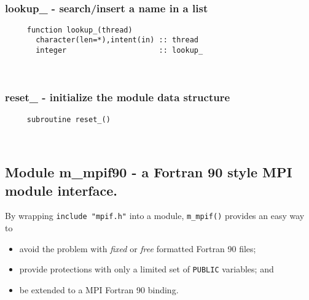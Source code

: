  
\mbox{}\hrulefill\ 
 
  \subsubsection{lookup\_ - search/insert a name in a list}

\begin{verbatim} 
     function lookup_(thread)
       character(len=*),intent(in) :: thread
       integer                     :: lookup_
 \end{verbatim}%
 
 
\mbox{}\hrulefill\ 
 
  \subsubsection{reset\_ - initialize the module data structure}

\begin{verbatim} 
     subroutine reset_()
 \end{verbatim}%


 
 
\mbox{}\hrulefill\ 
 
  \subsection{Module m\_mpif90 - a Fortran 90 style MPI module interface. }

     By wrapping \verb'include "mpif.h"' into a module, \verb"m_mpif()"
     provides an easy way to
  \begin{itemize}
    \item avoid the problem with {\sl fixed} or {\sl free} formatted
  	Fortran 90 files;
    \item provide protections with only a limited set of \verb"PUBLIC"
  	variables; and
    \item be extended to a MPI Fortran 90 binding.
  \end{itemize}
  
